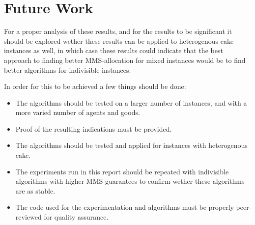 \section{Future Work}\label{sec:future-work}

For a proper analysis of these results, and for the results to be significant it should be explored wether these results can be applied to heterogenous cake instances as well, in which case these results could indicate that the best approach to finding better MMS-allocation for mixed instances would be to find better algorithms for indivisible instances.

In order for this to be achieved a few things should be done:

\begin{itemize}
    \item The algorithms should be tested on a larger number of instances, and with a more varied number of agents and goods.
    \item Proof of the resulting indications must be provided.
    \item The algorithms should be tested and applied for instances with heterogenous cake.
    \item The experiments run in this report should be repeated with indivisible algorithms with higher MMS-guarantees to confirm wether these algorithms are as stable.
    \item The code used for the experimentation and algorithms must be properly peer-reviewed for quality assurance.
\end{itemize}




